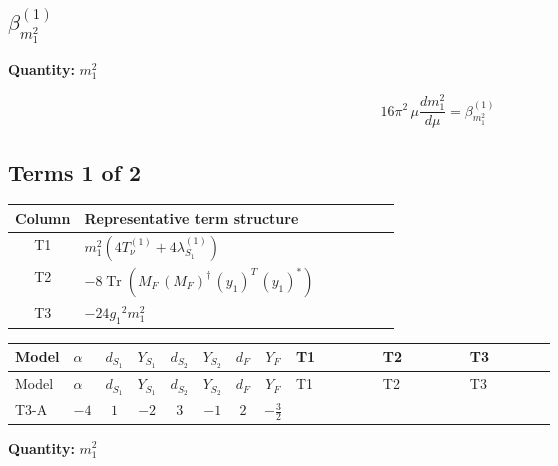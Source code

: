 \documentclass[8pt]{article}
\begin{document}
\begin{landscape}
\section*{$\beta_{m_1^2}^{(1)}$}
\noindent\textbf{Quantity: }$m_1^2$\par\smallskip
\[16\pi^2\,\mu\frac{d m_1^2}{d\mu}=\beta_{m_1^2}^{(1)}\]
\subsection*{Terms 1 of 2}
\begin{center}
\begin{tabular}{@{}c >{\raggedright\arraybackslash}p{0.82\linewidth}@{}}
\toprule
Column & Representative term structure \\
\midrule
T1 & \(\displaystyle {m_1^2} (4 T_{\nu}^{(1)}+4 {\lambda_{S_1}^{(1)}})\) \\
\midrule
T2 & \(\displaystyle -8 \operatorname{Tr}\!\left({M_F}\,\left({M_F}\right)^{\dagger}\,\left({y_1}\right)^{T}\,\left({y_1}\right)^{*}\right)\) \\
\midrule
T3 & \(\displaystyle -24 {g_1}^2 {m_1^2}\) \\
\midrule
\bottomrule
\end{tabular}
\end{center}
\smallskip
\tiny
\begin{longtable}{@{}llcccccc >{\raggedright\arraybackslash}p{0.21\linewidth} >{\raggedright\arraybackslash}p{0.21\linewidth} >{\raggedright\arraybackslash}p{0.21\linewidth}@{}}
\toprule
Model & $\alpha$ & $d_{S_1}$ & $Y_{S_1}$ & $d_{S_2}$ & $Y_{S_2}$ & $d_F$ & $Y_F$ & T1 & T2 & T3 \\
\midrule
\endfirsthead
\toprule
Model & $\alpha$ & $d_{S_1}$ & $Y_{S_1}$ & $d_{S_2}$ & $Y_{S_2}$ & $d_F$ & $Y_F$ & T1 & T2 & T3 \\
\midrule
\endhead
T3-A & $-4$ & $1$ & $-2$ & $3$ & $-1$ & $2$ & $-\frac{3}{2}$ & \scriptsize\adjustbox{max width=\linewidth}{$\begin{gathered} {m_1^2} (4 T_{\nu}^{(1)}+4 {\lambda_{S_1}^{(1)}})\end{gathered}$} & \scriptsize\adjustbox{max width=\linewidth}{$\begin{gathered} -8 \operatorname{Tr}\!\left({M_F}\,\left({M_F}\right)^{\dagger}\,\left({y_1}\right)^{T}\,\left({y_1}\right)^{*}\right)\end{gathered}$} & \scriptsize\adjustbox{max width=\linewidth}{$\begin{gathered} -24 {g_1}^2 {m_1^2}\end{gathered}$} \\
\midrule
\bottomrule
\end{longtable}
\clearpage
\noindent\textbf{Quantity: }$m_1^2$\par\smallskip

\end{landscape}
\end{document}
